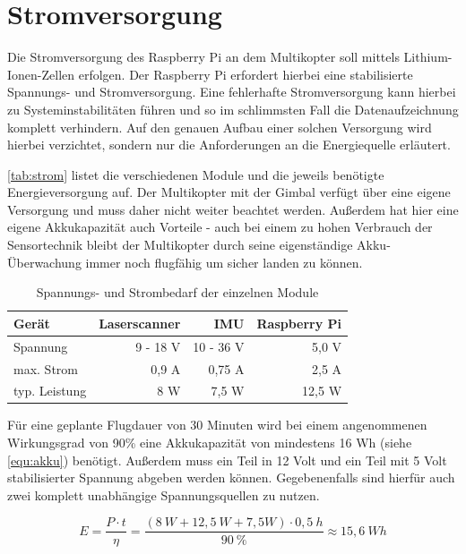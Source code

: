 \documentclass[a4paper,12pt,bibliography=totoc, listof=totoc,titlepage,pointlessnumbers]{scrreprt}
\begin{document}
\section{Stromversorgung}
Die Stromversorgung des Raspberry Pi an dem Multikopter soll mittels Lithium-Ionen-Zellen erfolgen. Der Raspberry Pi erfordert hierbei eine stabilisierte Spannungs- und Stromversorgung. Eine fehlerhafte Stromversorgung kann hierbei zu Systeminstabilitäten führen und so im schlimmsten Fall die Datenaufzeichnung komplett verhindern. Auf den genauen Aufbau einer solchen Versorgung wird hierbei verzichtet, sondern nur die Anforderungen an die Energiequelle erläutert.

\autoref{tab:strom} listet die verschiedenen Module und die jeweils benötigte Energieversorgung auf. Der Multikopter mit der Gimbal verfügt über eine eigene Versorgung und muss daher nicht weiter beachtet werden. Außerdem hat hier eine eigene Akkukapazität auch Vorteile - auch bei einem zu hohen Verbrauch der Sensortechnik bleibt der Multikopter durch seine eigenständige Akku-Überwachung immer noch flugfähig um sicher landen zu können.

\begin{table}
\centering
\begin{tabular}{ l | r | r | r }
  Gerät 	& Laser\-scan\-ner	& IMU		& Raspberry Pi\\
  \hline
  Spannung 	& 9 - 18 V 	& 10 - 36 V	& 5,0 V \\
  \hline
  max. Strom 	& 0,9 A		& 0,75 A	& 2,5 A \\
  \hline
  typ. Leistung	& 8 W		& 7,5 W		& 12,5 W 
\end{tabular}
\caption{Spannungs- und Strombedarf der einzelnen Module \citep{vlpSheet,imar,raspSheet}}
\label{tab:strom}
\end{table}

Für eine geplante Flugdauer von 30 Minuten wird bei einem angenommenen Wirkungsgrad von 90\% eine Akkukapazität von mindestens 16 Wh (siehe \autoref{equ:akku}) benötigt. Außerdem muss ein Teil in 12 Volt und ein Teil mit 5 Volt stabilisierter Spannung abgeben werden können. Gegebenenfalls sind hierfür auch zwei komplett unabhängige Spannungsquellen zu nutzen.

\begin{equation}
\label{equ:akku}
E = \frac{ P \cdot t}{\eta} = \frac{(8~W + 12,5~W + 7,5W) \cdot 0,5~h}{90~\%} \approx 15,6~Wh
\end{equation}
\end{document}
